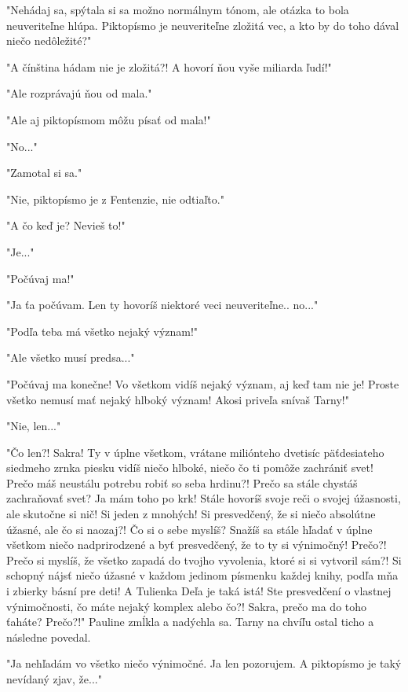 \documentclass{book}
\begin{document}
"$ $Nehádaj sa, spýtala si sa možno normálnym tónom, ale otázka to bola neuveriteľne hlúpa. Piktopísmo je neuveriteľne zložitá vec, a kto by do toho dával niečo nedôležité?"$ $ 

"$ $A čínština hádam nie je zložitá?! A hovorí ňou vyše miliarda ľudí!"$ $ 

"$ $Ale rozprávajú ňou od mala."$ $ 

"$ $Ale aj piktopísmom môžu písať od mala!"$ $ 

"$ $No..."$ $ 

"$ $Zamotal si sa."$ $ 

"$ $Nie, piktopísmo je z Fentenzie, nie odtiaľto."$ $ 

"$ $A čo keď je? Nevieš to!"$ $ 

"$ $Je..."$ $ 

"$ $Počúvaj ma!"$ $ 

"$ $Ja ťa počúvam. Len ty hovoríš niektoré veci neuveriteľne.. no..."$ $ 

"$ $Podľa teba má všetko nejaký význam!"$ $ 

"$ $Ale všetko musí predsa..."$ $ 

"$ $Počúvaj ma konečne! Vo všetkom vidíš nejaký význam, aj keď tam nie je! Proste všetko nemusí mať nejaký hlboký význam! Akosi priveľa snívaš Tarny!"$ $ 

"$ $Nie, len..."$ $ 

"$ $Čo len?! Sakra! Ty v úplne všetkom, vrátane miliónteho dvetisíc päťdesiateho siedmeho zrnka piesku vidíš niečo hlboké, niečo čo ti pomôže zachrániť svet! Prečo máš neustálu potrebu robiť so seba hrdinu?! Prečo sa stále chystáš zachraňovať svet? Ja mám toho po krk! Stále hovoríš svoje reči o svojej úžasnosti, ale skutočne si nič! Si jeden z mnohých! Si presvedčený, že si niečo absolútne úžasné, ale čo si naozaj?! Čo si o sebe myslíš? Snažíš sa stále hľadať v úplne všetkom niečo nadprirodzené a byť presvedčený, že to ty si výnimočný! Prečo?! Prečo si myslíš, že všetko zapadá do tvojho vyvolenia, ktoré si si vytvoril sám?! Si schopný nájsť niečo úžasné v každom jedinom písmenku každej knihy, podľa mňa i zbierky básní pre deti! A Tulienka Deľa je taká istá! Ste presvedčení o vlastnej výnimočnosti, čo máte nejaký komplex alebo čo?! Sakra, prečo ma do toho ťaháte? Prečo?!"$ $  Pauline zmĺkla a nadýchla sa. Tarny na chvíľu ostal ticho a následne povedal.

"$ $Ja nehľadám vo všetko niečo výnimočné. Ja len pozorujem. A piktopísmo je taký nevídaný zjav, že..."$ $ 
\end{document}
